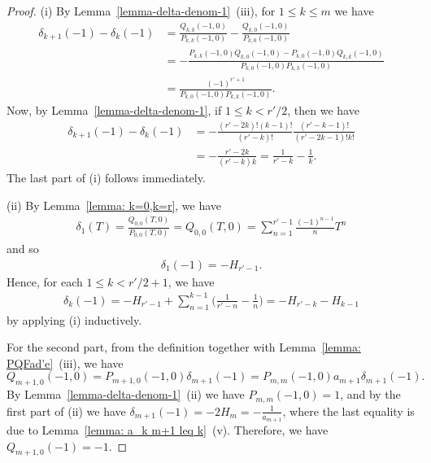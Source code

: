 \documentclass[11pt]{amsart}
\theoremstyle{definition}
\numberwithin{equation}{subsection}
\theoremstyle{plain}
\theoremstyle{plain}
\theoremstyle{plain}
\theoremstyle{plain}
\theoremstyle{plain}
\theoremstyle{plain}
\theoremstyle{plain}
\theoremstyle{plain}
\theoremstyle{plain}
\theoremstyle{plain}
\theoremstyle{plain}
\theoremstyle{plain}
\theoremstyle{definition}
\theoremstyle{definition}
\theoremstyle{definition}
\theoremstyle{remark}
\renewcommand{\(}{\textup{(}}
\renewcommand{\)}{\textup{)}}
\begin{document}
\begin{proof}
(i) By Lemma~\ref{lemma-delta-denom-1}~(iii), for $1\leq k\leq m$ we have
    \begin{align*}
        \delta_{k+1}(-1)-\delta_k(-1)
        &=
        \frac{Q_{k,k}(-1,0)}{P_{k,k}(-1,0)}-\frac{Q_{k,0}(-1,0)}{P_{k,0}(-1,0)}\\
        &=
        -\frac{
        P_{k,k}(-1,0)Q_{k,0}(-1,0)-P_{k,0}(-1,0)Q_{k,k}(-1,0)
        }{
        P_{k,0}(-1,0)P_{k,k}(-1,0)
        }\\
        &=
        \frac{(-1)^{r'+1}}{P_{k,0}(-1,0)P_{k,k}(-1,0)}.
    \end{align*}
Now, by Lemma~\ref{lemma-delta-denom-1}, if $1\leq k<r'/2$, then we have
    \begin{align*}
        \delta_{k+1}(-1)-\delta_k(-1)
        &=
        -\frac{(r'-2k)!(k-1)!}{(r'-k)!}\frac{(r'-k-1)!}{(r'-2k-1)!k!}\\
        &=
        -\frac{r'-2k}{(r'-k)k}=
        \frac{1}{r'-k}-\frac{1}{k}.
    \end{align*}
The last part of (i) follows immediately.

(ii) By Lemma~\ref{lemma: k=0,k=r}, we have
    \begin{align*}
        \delta_1(T)=\frac{Q_{0,0}(T,0)}{P_{0,0}(T,0)}=Q_{0,0}(T,0)
        =\sum_{n=1}^{r'-1}\frac{(-1)^{n-1}}{n}T^n
    \end{align*}
    and so
    \begin{align*}
        \delta_1(-1)
        =-H_{r'-1}.
    \end{align*}
Hence, for each $1\leq k<r'/2+1$, we have
    \begin{align*}
        \delta_k(-1)
        =-H_{r'-1}+\sum_{n=1}^{k-1}\bigg(\frac{1}{r'-n}-\frac{1}{n}\bigg)
        =-H_{r'-k}-H_{k-1}
    \end{align*}
by applying (i) inductively.

For the second part, from the definition together with Lemma~\ref{lemma: PQFad'e}~(iii), we have
$$Q_{m+1,0}(-1,0)=P_{m+1,0}(-1,0)\delta_{m+1}(-1)=P_{m,m}(-1,0)a_{m+1}\delta_{m+1}(-1).$$
By Lemma~\ref{lemma-delta-denom-1}~(ii) we have $P_{m,m}(-1,0)=1$, and by the first part of (ii) we have $\delta_{m+1}(-1)=-2H_m=-\frac{1}{a_{m+1}}$, where the last equality is due to Lemma~\ref{lemma: a_k m+1 leq k}~(v). Therefore, we have $Q_{m+1,0}(-1)=-1$.




\end{proof}
\end{document}
